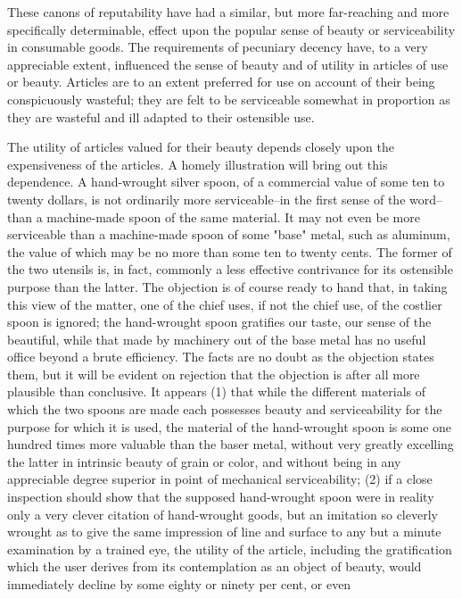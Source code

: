 \documentclass[12pt]{report}
\begin{document}
These canons of reputability have had a similar, but more far-reaching
and more specifically determinable, effect upon the popular sense
of beauty or serviceability in consumable goods. The requirements of
pecuniary decency have, to a very appreciable extent, influenced the
sense of beauty and of utility in articles of use or beauty.
Articles are to an extent preferred for use on account of their being
conspicuously wasteful; they are felt to be serviceable somewhat in
proportion as they are wasteful and ill adapted to their ostensible use.

The utility of articles valued for their beauty depends closely upon the
expensiveness of the articles. A homely illustration will bring out this
dependence. A hand-wrought silver spoon, of a commercial value of some
ten to twenty dollars, is not ordinarily more serviceable--in the first
sense of the word--than a machine-made spoon of the same material.
It may not even be more serviceable than a machine-made spoon of some
"base" metal, such as aluminum, the value of which may be no more than
some ten to twenty cents. The former of the two utensils is, in fact,
commonly a less effective contrivance for its ostensible purpose than
the latter. The objection is of course ready to hand that, in taking
this view of the matter, one of the chief uses, if not the chief use,
of the costlier spoon is ignored; the hand-wrought spoon gratifies our
taste, our sense of the beautiful, while that made by machinery out of
the base metal has no useful office beyond a brute efficiency. The facts
are no doubt as the objection states them, but it will be evident
on rejection that the objection is after all more plausible than
conclusive. It appears (1) that while the different materials of which
the two spoons are made each possesses beauty and serviceability for the
purpose for which it is used, the material of the hand-wrought spoon is
some one hundred times more valuable than the baser metal, without very
greatly excelling the latter in intrinsic beauty of grain or color, and
without being in any appreciable degree superior in point of mechanical
serviceability; (2) if a close inspection should show that the supposed
hand-wrought spoon were in reality only a very clever citation of
hand-wrought goods, but an imitation so cleverly wrought as to give the
same impression of line and surface to any but a minute examination by
a trained eye, the utility of the article, including the gratification
which the user derives from its contemplation as an object of beauty,
would immediately decline by some eighty or ninety per cent, or even
\end{document}
